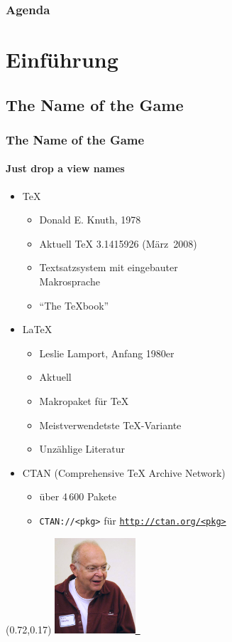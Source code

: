 \documentclass[t,ngerman,compress]{beamer}
\begin{document}
\begin{frame}
  \frametitle{Agenda}
  \tableofcontents[hideallsubsections]
\end{frame}

\section{Einf\"uhrung}

\subsection{The Name of the Game}

\begin{frame}
  \frametitle{The Name of the Game}
  \framesubtitle{Just drop a view names}
  \begin{itemize}
  \item \TeX
    \begin{itemize}
    \item Donald E. Knuth, 1978
    \item Aktuell \TeX{} 3.1415926 (März~2008)
    \item Textsatzsystem mit eingebauter\\
      Makrosprache
    \item \enquote{The \TeX{}book}
    \end{itemize}
  \item \LaTeX
    \begin{itemize}
    \item Leslie Lamport, Anfang 1980er
    \item Aktuell 
    \item Makropaket für \TeX
    \item Meistverwendetste \TeX-Variante
    \item Unzählige Literatur
    \end{itemize}
  \item CTAN (Comprehensive \TeX{} Archive Network)
    \begin{itemize}
    \item über 4\,600 Pakete
    \item \texttt{CTAN://<pkg>} für \href{http://ctan.org}{\texttt{http://ctan.org/<pkg>}}
    \end{itemize}
  \end{itemize}
  \begin{textblock}{3}(0.72,0.17)
    \href{https://en.wikipedia.org/wiki/File:KnuthAtOpenContentAlliance.jpg}{%
      \includegraphics[width=3cm]{don-knuth}~%
}
\end{textblock}
\end{frame}
\end{document}
